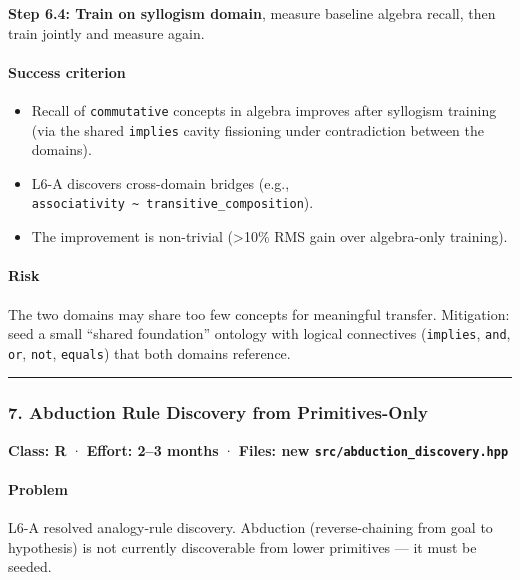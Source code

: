 \documentclass[
  11pt,
  a4paper,
]{article}
\providecommand{\tightlist}{%
  \setlength{\itemsep}{0pt}\setlength{\parskip}{0pt}}
\begin{document}
\textbf{Step 6.4: Train on syllogism domain}, measure baseline algebra
recall, then train jointly and measure again.

\paragraph{Success criterion}\label{success-criterion-5}

\begin{itemize}
\tightlist
\item
  Recall of \texttt{commutative} concepts in algebra improves after
  syllogism training (via the shared \texttt{implies} cavity fissioning
  under contradiction between the domains).
\item
  L6-A discovers cross-domain bridges (e.g.,
  \texttt{associativity\ \textasciitilde{}\ transitive\_composition}).
\item
  The improvement is non-trivial (\textgreater10\% RMS gain over
  algebra-only training).
\end{itemize}

\paragraph{Risk}\label{risk-2}

The two domains may share too few concepts for meaningful transfer.
Mitigation: seed a small ``shared foundation'' ontology with logical
connectives (\texttt{implies}, \texttt{and}, \texttt{or}, \texttt{not},
\texttt{equals}) that both domains reference.

\begin{center}\rule{0.5\linewidth}{0.5pt}\end{center}

\subsubsection{7. Abduction Rule Discovery from
Primitives-Only}\label{abduction-rule-discovery-from-primitives-only-1}

\textbf{Class: R} · \textbf{Effort: 2--3 months} · \textbf{Files: new
\texttt{src/abduction\_discovery.hpp}}

\paragraph{Problem}\label{problem-6}

L6-A resolved analogy-rule discovery. Abduction (reverse-chaining from
goal to hypothesis) is not currently discoverable from lower primitives
--- it must be seeded.
\end{document}
